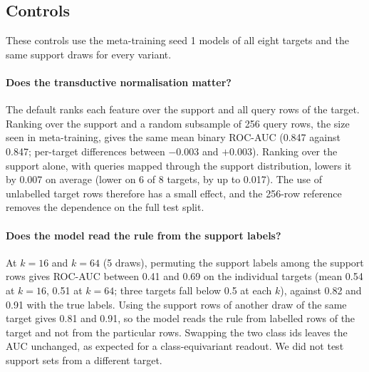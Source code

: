 \subsection{Controls}\label{sec:controls}
These controls use the meta-training seed 1 models of all eight targets and the same support draws for every variant.

\paragraph{Does the transductive normalisation matter?}
The default ranks each feature over the support and all query rows of the target. Ranking over the support and a random subsample of 256 query rows, the size seen in meta-training, gives the same mean binary ROC-AUC (0.847 against 0.847; per-target differences between $-0.003$ and $+0.003$). Ranking over the support alone, with queries mapped through the support distribution, lowers it by 0.007 on average (lower on 6 of 8 targets, by up to 0.017). The use of unlabelled target rows therefore has a small effect, and the 256-row reference removes the dependence on the full test split.

\paragraph{Does the model read the rule from the support labels?}
At $k{=}16$ and $k{=}64$ (5 draws), permuting the support labels among the support rows gives ROC-AUC between 0.41 and 0.69 on the individual targets (mean 0.54 at $k{=}16$, 0.51 at $k{=}64$; three targets fall below 0.5 at each $k$), against 0.82 and 0.91 with the true labels. Using the support rows of another draw of the same target gives 0.81 and 0.91, so the model reads the rule from labelled rows of the target and not from the particular rows. Swapping the two class ids leaves the AUC unchanged, as expected for a class-equivariant readout. We did not test support sets from a different target.
